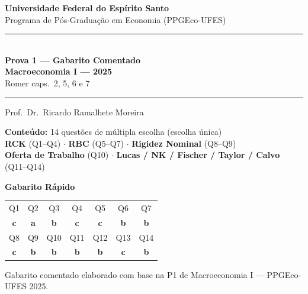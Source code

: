 \documentclass[12pt, a4paper]{article}
\begin{document}

\begin{titlepage}
\begin{center}
\vspace*{1.5cm}
{\Large\bfseries Universidade Federal do Espírito Santo}\\[0.5em]
{\large Programa de Pós-Graduação em Economia (PPGEco-UFES)}\\[2em]

\rule{\linewidth}{1.2pt}\\[0.8em]
{\LARGE\bfseries\color{cyanrbc} Prova 1 --- Gabarito Comentado\\[0.4em]
\large Macroeconomia I --- 2025}\\[0.4em]
{\normalsize\color{grayrbc} Romer caps.\ 2, 5, 6 e 7}\\[0.8em]
\rule{\linewidth}{1.2pt}

\vspace{1em}
{\large Prof.\ Dr.\ Ricardo Ramalhete Moreira}

\vspace{1.5em}
\begin{tcolorbox}[standard, colback=provabg, colframe=provaborder, width=0.88\textwidth,
  arc=4pt, boxrule=1.2pt, left=8pt, right=8pt, top=6pt, bottom=6pt]
\centering
\textbf{\textcolor{provaborder}{Conteúdo:}} 14 questões de múltipla escolha (escolha única)\\[0.4em]
\textbf{RCK} (Q1--Q4) $\cdot$ \textbf{RBC} (Q5--Q7) $\cdot$ \textbf{Rigidez Nominal} (Q8--Q9)\\[0.2em]
\textbf{Oferta de Trabalho} (Q10) $\cdot$
\textbf{Lucas / NK / Fischer / Taylor / Calvo} (Q11--Q14)
\end{tcolorbox}

\vspace{1.5em}
\begin{tcolorbox}[standard, colback=correctbg, colframe=correctborder,
  width=0.88\textwidth, arc=4pt, boxrule=1pt, left=8pt, right=8pt,
  top=6pt, bottom=6pt]
\centering
\textbf{\textcolor{correctborder}{Gabarito Rápido}}\\[0.6em]
\begin{tabular}{ccccccc}
\toprule
Q1 & Q2 & Q3 & Q4 & Q5 & Q6 & Q7 \\
\textbf{c} & \textbf{a} & \textbf{b} & \textbf{c} & \textbf{c} & \textbf{b} & \textbf{b} \\
\midrule
Q8 & Q9 & Q10 & Q11 & Q12 & Q13 & Q14 \\
\textbf{c} & \textbf{b} & \textbf{b} & \textbf{b} & \textbf{b} & \textbf{c} & \textbf{b} \\
\bottomrule
\end{tabular}
\end{tcolorbox}

\vfill
{\small Gabarito comentado elaborado com base na P1 de Macroeconomia I --- PPGEco-UFES 2025.}
\end{center}
\end{titlepage}
\end{document}
